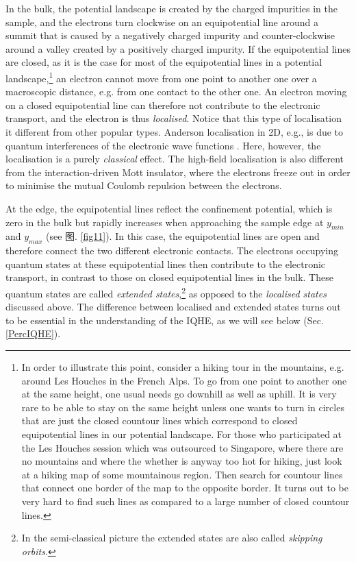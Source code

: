 \documentclass[10pt]{book}
\begin{document}
In the bulk,
the potential landscape is created by the charged impurities in the sample, and the electrons turn clockwise on an equipotential
line around a summit that is caused by a negatively charged impurity and counter-clockwise around a valley created by a 
positively charged impurity. If the equipotential lines are closed, as it is the case for most of the equipotential lines in
a potential landscape,\footnote{In order to illustrate this point, consider a hiking tour in the mountains, e.g. around Les Houches
in the French Alps. To 
go from one point to another one at the same height, one usual needs go downhill as well as uphill. It is very rare to be able 
to stay on the same height unless one wants to turn in circles that are just the closed countour lines
which correspond to closed equipotential lines in our potential landscape. For those who participated 
at the Les Houches session which was outsourced to Singapore, where there are no mountains and where the whether is anyway too hot
for hiking, just look at a hiking map of some mountainous region. Then search for countour lines that connect one border of the map
to the opposite border. It turns out to be very hard to find such lines as compared to a large number of closed countour lines.
}
an electron cannot move from one point to another one over a macroscopic distance, e.g. from one contact to the other one.
An electron moving on a closed equipotential line
can therefore not contribute to the electronic transport, and the electron is thus {\sl localised}. Notice that
this type of localisation it different from other popular types. Anderson localisation in 2D, e.g., is due to quantum
interferences of the electronic wave functions \cite{AALR}. Here, however, the localisation is a purely {\sl classical} effect.
The high-field localisation is also different from the interaction-driven Mott insulator, where the electrons freeze out
in order to minimise the mutual Coulomb repulsion between the electrons. %

At the edge, the equipotential lines reflect the confinement potential, which is zero in the bulk but rapidly increases when
approaching the sample edge at $y_{min}$ and $y_{max}$ (see 图. \ref{fig11}). In this case, the equipotential lines are open
and therefore connect the two different electronic contacts. The electrons occupying quantum states 
at these equipotential lines then contribute
to the electronic transport, in contrast to those on closed equipotential lines in the bulk. These quantum states are called
{\sl extended states},\footnote{In the semi-classical picture the extended states are also called {\sl skipping orbits}.}
as opposed to the {\sl localised states} discussed above. The difference between localised and
extended states turns out to be essential in the understanding of the IQHE, as we will see below (Sec. \ref{PercIQHE}).
\end{document}
